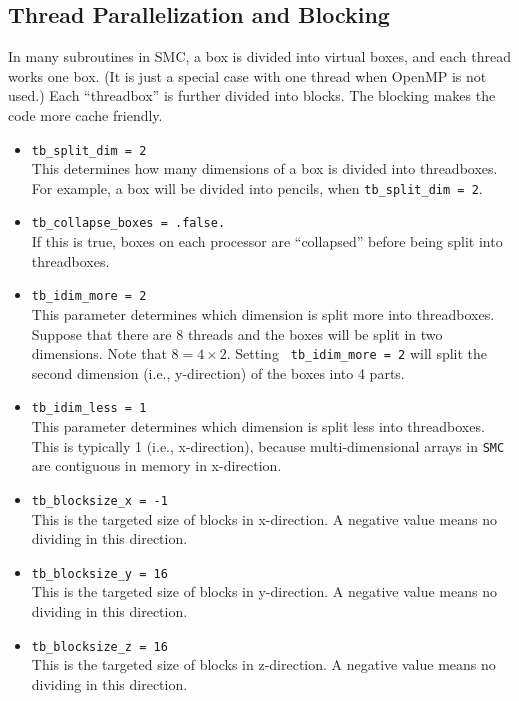 \documentclass[11pt,letterpaper]{article}
\begin{document}
\subsection{Thread Parallelization and Blocking}

In many subroutines in SMC, a box is divided into virtual boxes, and
each thread works one box.  (It is just a special case with one thread
when OpenMP is not used.)  Each ``threadbox'' is further divided into
blocks.  The blocking makes the code more cache friendly. 

\begin{itemize}
\item {\tt tb\_split\_dim = 2}\\
  This determines how many dimensions of a box is divided into
  threadboxes.  For example, a box will be divided into pencils, when
  {\tt tb\_split\_dim = 2}.
\item {\tt tb\_collapse\_boxes = .false.}\\
  If this is true, boxes on each processor are ``collapsed'' before
  being split into threadboxes.
\item {\tt tb\_idim\_more = 2}\\
  This parameter determines which dimension is split more into
  threadboxes.  Suppose that there are 8 threads and the boxes will be
  split in two dimensions.  Note that $8 = 4 \times 2$.  Setting {\tt
    tb\_idim\_more = 2} will split the second dimension (i.e.,
  y-direction) of the boxes into 4 parts.
\item {\tt tb\_idim\_less = 1}\\
  This parameter determines which dimension is split less into
  threadboxes.  This is typically 1 (i.e., x-direction), because
  multi-dimensional arrays in {\tt SMC} are contiguous in memory in
  x-direction.
\item {\tt tb\_blocksize\_x = -1}\\
  This is the targeted size of blocks in x-direction.  A negative
  value means no dividing in this direction.
\item {\tt tb\_blocksize\_y = 16}\\
  This is the targeted size of blocks in y-direction.  A negative
  value means no dividing in this direction.
\item {\tt tb\_blocksize\_z = 16}\\
  This is the targeted size of blocks in z-direction.  A negative
  value means no dividing in this direction.
\end{itemize}
\end{document}
